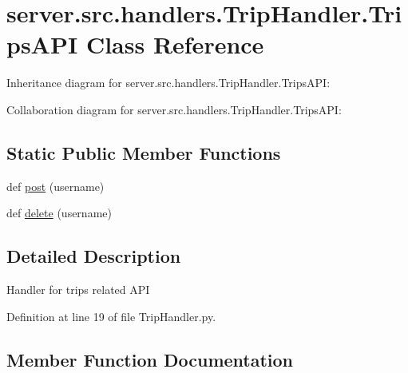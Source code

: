 \hypertarget{classserver_1_1src_1_1handlers_1_1_trip_handler_1_1_trips_a_p_i}{}\section{server.\+src.\+handlers.\+Trip\+Handler.\+Trips\+A\+PI Class Reference}
\label{classserver_1_1src_1_1handlers_1_1_trip_handler_1_1_trips_a_p_i}


Inheritance diagram for server.\+src.\+handlers.\+Trip\+Handler.\+Trips\+A\+PI\+:


Collaboration diagram for server.\+src.\+handlers.\+Trip\+Handler.\+Trips\+A\+PI\+:
\subsection*{Static Public Member Functions}
\begin{DoxyCompactItemize}
\item 
def \hyperlink{classserver_1_1src_1_1handlers_1_1_trip_handler_1_1_trips_a_p_i_a92475d28eeac271284ee783e201938ee}{post} (username)
\item 
def \hyperlink{classserver_1_1src_1_1handlers_1_1_trip_handler_1_1_trips_a_p_i_a6d7e915cdfa4790f2ba872e5466c2942}{delete} (username)
\end{DoxyCompactItemize}


\subsection{Detailed Description}
\begin{DoxyVerb}Handler for trips related API\end{DoxyVerb}
 

Definition at line 19 of file Trip\+Handler.\+py.



\subsection{Member Function Documentation}

